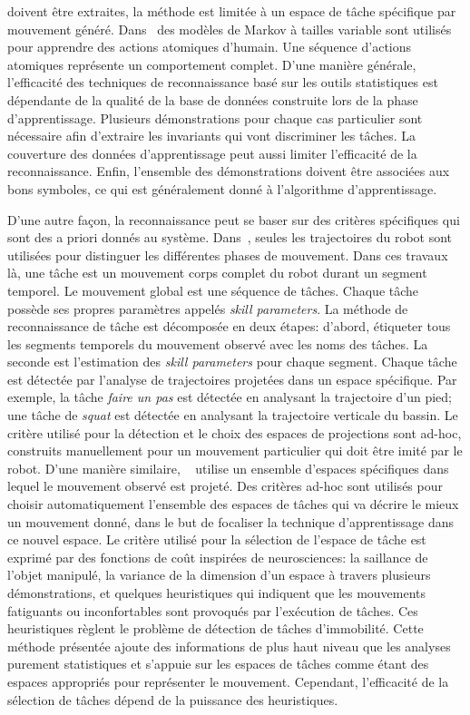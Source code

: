 doivent être extraites, la méthode est limitée à un espace de t\^ache spécifique par mouvement
généré.
Dans~\cite{liang09} des modèles de Markov à tailles variable sont utilisés
pour apprendre des actions atomiques d'humain. Une séquence d'actions atomiques représente
un comportement complet.
D'une manière générale, l'efficacité des techniques de reconnaissance basé sur les outils 
statistiques est dépendante de la qualité de la base de données construite lors de la phase 
d'apprentissage.
Plusieurs démonstrations pour chaque cas particulier sont nécessaire afin
d'extraire les invariants qui vont discriminer les t\^aches.
La couverture des données d'apprentissage peut aussi limiter l'efficacité de la reconnaissance.
Enfin, l'ensemble des démonstrations doivent être associées
aux bons symboles, ce qui est généralement donné à l'algorithme
d'apprentissage.

D'une autre façon, la reconnaissance peut se baser sur des critères spécifiques qui
sont des a priori donnés au système.
Dans~\cite{nakaoka07}, seules les trajectoires du robot sont utilisées pour
distinguer les différentes phases de mouvement. Dans ces travaux là, une t\^ache
est un mouvement corps complet du robot durant un segment temporel.
Le mouvement global est une séquence de t\^aches. Chaque t\^ache possède 
ses propres paramètres appelés \emph{skill parameters}.
La méthode de reconnaissance de t\^ache est décomposée en deux étapes:
d'abord, étiqueter tous les segments temporels du mouvement 
observé avec les noms des t\^aches.
La seconde est l'estimation des \emph{skill parameters} pour chaque segment.
Chaque t\^ache est détectée par l'analyse de trajectoires projetées
dans un espace spécifique. Par exemple, la t\^ache \emph{faire un pas} est détectée
en analysant la trajectoire d'un pied;
une t\^ache de \emph{squat} est détectée en analysant la trajectoire verticale
du bassin. Le critère utilisé pour la détection et le choix des espaces de projections
sont ad-hoc, construits manuellement pour un mouvement particulier qui doit être imité par
le robot.
D'une manière similaire, ~\cite{muhlig09}
utilise un ensemble d'espaces spécifiques dans lequel le mouvement 
observé est projeté. Des critères ad-hoc
sont utilisés pour choisir automatiquement l'ensemble des espaces de t\^aches qui va 
décrire le mieux un mouvement donné, dans le but de focaliser la technique 
d'apprentissage dans ce nouvel espace. Le critère utilisé pour la
sélection de l'espace de t\^ache est exprimé par
des fonctions de coût inspirées de neurosciences:
la saillance de l'objet manipulé, la variance de la dimension d'un espace à travers
plusieurs démonstrations, et quelques heuristiques qui indiquent que les mouvements
fatiguants ou inconfortables sont provoqués par l'exécution de t\^aches. Ces heuristiques
règlent le problème de détection de t\^aches d'immobilité.
Cette méthode présentée ajoute des informations de plus haut niveau que les analyses
purement statistiques et s'appuie sur les espaces de t\^aches comme 
étant des espaces appropriés pour représenter le mouvement. Cependant, l'efficacité
de la sélection de t\^aches dépend de la puissance des heuristiques.

